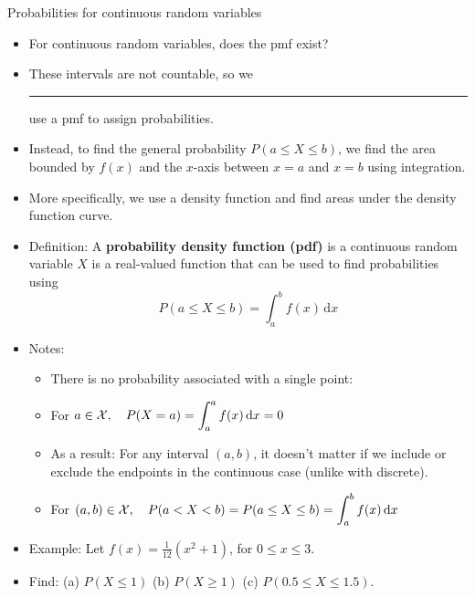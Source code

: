 \documentclass{article}
\newcommand{\blankul}[1]{\rule[-1.5mm]{#1}{0.15mm}}	%
\newcommand{\integral}[4]{\displaystyle \int_{#1}^{#2} #3 \,\mathrm{d} #4}		%
\begin{document}
Probabilities for continuous random variables\bigskip
\begin{itemize}
    \item For continuous random variables, does the pmf exist?
    \item[] These intervals are not countable, so we \blankul{1.5cm} use a pmf to assign probabilities.
    \item Instead, to find the general probability $P(a \le X \le b)$, we find the area bounded by $f(x)$ and the $x$-axis between $x = a$ and $x = b$ using integration.
    \item[] More specifically, we use a density function and find areas under the density function curve.
    \item Definition: A \textbf{probability density function (pdf)} is a continuous random variable $X$ is a real-valued function that can be used to find probabilities using
    \[P(a \le X \le b) = \integral{a}{b}{f(x)}{x}\]
    \item Notes:
    \begin{itemize}
        \item There is no probability associated with a single point:
        \item[] For $a \in {\cal X}, \hspace{10pt} P(X = a) = \integral{a}{a}{f(x)}{x} = 0$
        \item As a result: For any interval $(a, b)$, it doesn't matter if we include or exclude the endpoints in the continuous case (unlike with discrete).
        \item[] For $(a, b) \in {\cal X}, \hspace{10pt} P(a < X < b) =  P(a \le X \le b) =  \integral{a}{b}{f(x)}{x}$\vspace{30pt}
    \end{itemize}
    \item Example: Let $f(x) = \frac{1}{12}(x^2 + 1)$, \quad for $0 \le x \le 3$.
    \item[] Find: (a) $P(X \le 1)$ \hspace{50pt} (b) $P(X \ge 1)$ \hspace{50pt} (c) $P(0.5 \le X \le 1.5)$.\vspace{120pt}
\end{itemize}
\end{document}
